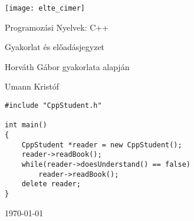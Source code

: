 \documentclass[a4paper,11.5pt, table]{article}
\theoremstyle{definition}
\newcommand{\<}{<\hspace{0mm}<}
\newcommand{\onlyinsubfile}[1]{#1}
\newcommand{\notinsubfile}[1]{}
\begin{document}
	\renewcommand{\onlyinsubfile}[1]{}
	\renewcommand{\notinsubfile}[1]{#1}
	
	\begin{titlepage}
		\vspace*{2cm}
		\centering
		\texttt{[image: elte\_cimer]}
		
		\vspace*{2cm}
		{\Huge Programozási Nyelvek: C++ }
		
		\vspace{1cm}
		{\huge Gyakorlat és előadásjegyzet}
		
		\vspace*{5mm}
		{\large Horváth Gábor gyakorlata alapján}
		\vspace*{1.5cm}
		
		{\large Umann Kristóf}
		\vfill
		
		\begin{lstlisting}[frame=trbl, linewidth=12.6cm, xleftmargin=4.5cm, emph={CppStudent}]
#include "CppStudent.h"

int main()
{
	CppStudent *reader = new CppStudent();
	reader->readBook();
	while(reader->doesUnderstand() == false)
		reader->readBook();	
	delete reader;
}
		\end{lstlisting}
		\vfill
		
		\vspace*{1cm}
		\today
	\end{titlepage}
	\tableofcontents
	
	
	
	
	
	
	
	
	
	
	
	
\end{document}
